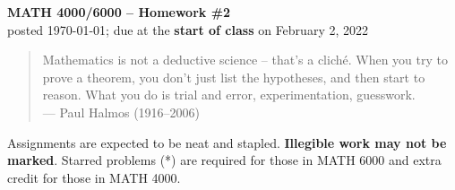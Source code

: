 \documentclass[11pt]{article}
\theoremstyle{plain}
\theoremstyle{remark}
\begin{document}
\thispagestyle{empty} \begin{center} {\textbf{MATH 4000/6000 --
Homework \#2}\\ posted \today; due at the \textbf{start of class} on February 2, 2022}
\end{center}

\begin{quote} {\scriptsize Mathematics is not a deductive science -- that's a clich\'e. When you try to prove a theorem, you don't just list the hypotheses, and then start to reason. What you do is trial and error, experimentation, guesswork. \\ --- Paul Halmos (1916--2006)}
\end{quote}

\noindent Assignments are expected to be neat and stapled. \textbf{Illegible work may not be marked}. Starred problems (*) are required for those in MATH 6000 and extra credit for those in MATH 4000.
\end{document}
